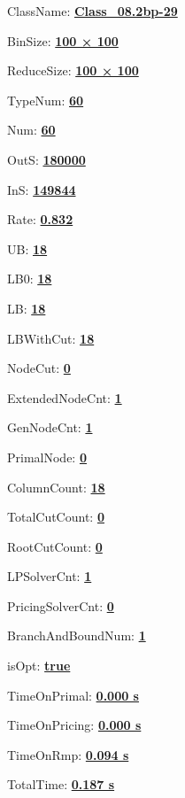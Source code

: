 \documentclass[11pt]{article}
\begin{document}
\pagestyle{empty}


ClassName: \underline{\textbf{Class_08.2bp-29}}
\par
BinSize: \underline{\textbf{100 × 100}}
\par
ReduceSize: \underline{\textbf{100 × 100}}
\par
TypeNum: \underline{\textbf{60}}
\par
Num: \underline{\textbf{60}}
\par
OutS: \underline{\textbf{180000}}
\par
InS: \underline{\textbf{149844}}
\par
Rate: \underline{\textbf{0.832}}
\par
UB: \underline{\textbf{18}}
\par
LB0: \underline{\textbf{18}}
\par
LB: \underline{\textbf{18}}
\par
LBWithCut: \underline{\textbf{18}}
\par
NodeCut: \underline{\textbf{0}}
\par
ExtendedNodeCnt: \underline{\textbf{1}}
\par
GenNodeCnt: \underline{\textbf{1}}
\par
PrimalNode: \underline{\textbf{0}}
\par
ColumnCount: \underline{\textbf{18}}
\par
TotalCutCount: \underline{\textbf{0}}
\par
RootCutCount: \underline{\textbf{0}}
\par
LPSolverCnt: \underline{\textbf{1}}
\par
PricingSolverCnt: \underline{\textbf{0}}
\par
BranchAndBoundNum: \underline{\textbf{1}}
\par
isOpt: \underline{\textbf{true}}
\par
TimeOnPrimal: \underline{\textbf{0.000 s}}
\par
TimeOnPricing: \underline{\textbf{0.000 s}}
\par
TimeOnRmp: \underline{\textbf{0.094 s}}
\par
TotalTime: \underline{\textbf{0.187 s}}
\par
\newpage


\end{document}
